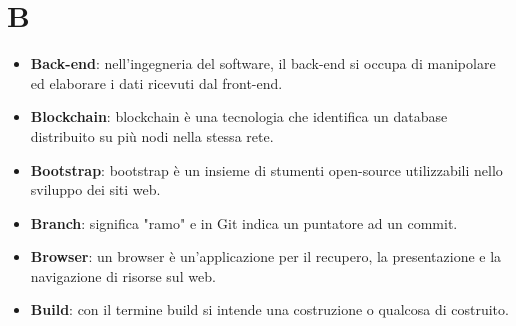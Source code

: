 \documentclass[a4paper, oneside, openany]{article}
\begin{document}
\section{B}
\begin{itemize}
\item \textbf{Back-end}: nell'ingegneria del software, il back-end si occupa di manipolare ed elaborare i dati ricevuti dal front-end.	
\item \textbf{Blockchain}: blockchain è una tecnologia che identifica un database distribuito su più nodi nella stessa rete.
\item \textbf{Bootstrap}: bootstrap è un insieme di stumenti open-source utilizzabili nello sviluppo dei siti web.
\item \textbf{Branch}: significa "ramo" e in Git indica un puntatore ad un commit.
\item \textbf{Browser}: un browser è un'applicazione per il recupero, la presentazione e la navigazione di risorse sul web.
\item \textbf{Build}: con il termine build si intende una costruzione o qualcosa di costruito.
\end{itemize}
\end{document}
